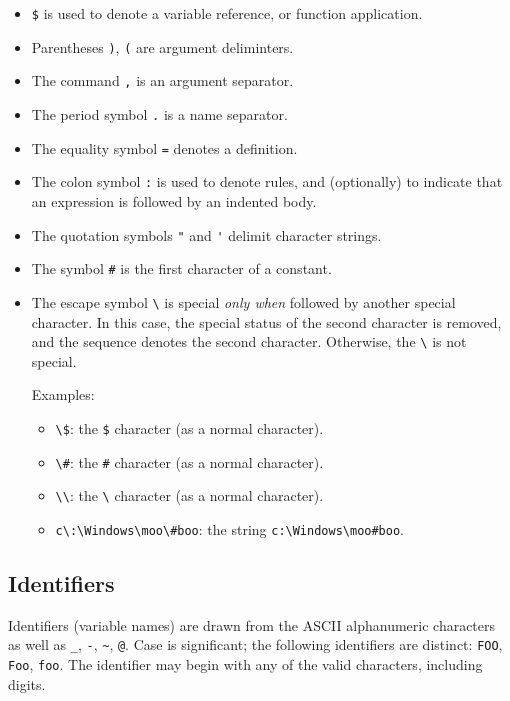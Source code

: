 \begin{itemize}
\item \verb+$+ is used to denote a variable reference, or function application.
\item Parentheses \verb+)+, \verb+(+ are argument deliminters.
\item The command \verb+,+ is an argument separator.
\item The period symbol \verb+.+ is a name separator.
\item The equality symbol \verb+=+ denotes a definition.
\item The colon symbol \verb+:+ is used to denote rules, and (optionally) to indicate
   that an expression is followed by an indented body.
\item The quotation symbols \verb+"+ and \verb+'+ delimit character strings.
\item The symbol \verb+#+ is the first character of a constant.
\item The escape symbol \verb+\+ is special \emph{only when} followed by another special
   character.  In this case, the special status of the second character is removed,
   and the sequence denotes the second character.  Otherwise, the \verb+\+ is not special.

   Examples:

   \begin{itemize}
   \item \verb+\$+: the \verb+$+ character (as a normal character).
   \item \verb+\#+: the \verb+#+ character (as a normal character).
   \item \verb+\\+: the \verb+\+ character (as a normal character).
   \item \verb+c\:\Windows\moo\#boo+: the string \verb+c:\Windows\moo#boo+.
   \end{itemize}
\end{itemize}

\subsection{Identifiers}

Identifiers (variable names) are drawn from the ASCII alphanumeric characters as well as \verb+_+,
\verb+-+, \verb+~+, \verb+@+.  Case is significant; the following identifiers are distinct:
\verb+FOO+, \verb+Foo+, \verb+foo+.  The identifier may begin with any of the valid characters,
including digits.

